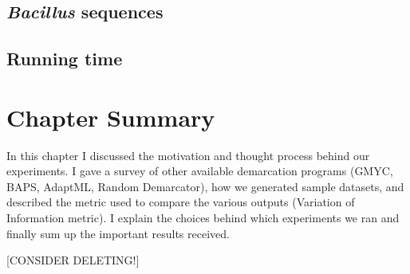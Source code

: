 \subsection*{\emph{Bacillus} sequences}
\subsection*{Running time}
\section{Chapter Summary}
In this chapter I discussed the motivation and thought process behind our experiments.
I gave a survey of other available demarcation programs (GMYC, BAPS, AdaptML, Random Demarcator), how we generated sample datasets, and described the metric used to compare the various outputs (Variation of Information metric).
I explain the choices behind which experiments we ran and finally sum up the important results received.

[CONSIDER DELETING!]




